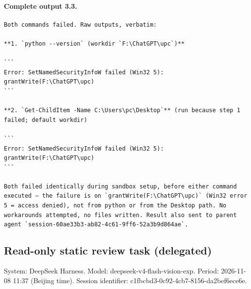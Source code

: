\documentclass[UTF8,10pt]{ctexart}
\begin{document}
\paragraph{Complete output 3.3.}
\begin{Verbatim}[breaklines=true,breakanywhere=true,fontsize=\scriptsize,frame=single,framesep=2pt]
Both commands failed. Raw outputs, verbatim:

**1. `python --version` (workdir `F:\ChatGPT\upc`)**

```
Error: SetNamedSecurityInfoW failed (Win32 5): grantWrite(F:\ChatGPT\upc)
```

**2. `Get-ChildItem -Name C:\Users\pc\Desktop`** (run because step 1 failed; default workdir)

```
Error: SetNamedSecurityInfoW failed (Win32 5): grantWrite(F:\ChatGPT\upc)
```

Both failed identically during sandbox setup, before either command executed — the failure is on `grantWrite(F:\ChatGPT\upc)` (Win32 error 5 = access denied), not from python or from the Desktop path. No workarounds attempted, no files written. Result also sent to parent agent `session-60ae33b3-ab82-4c61-9ff6-52a3b9d864ae`.
\end{Verbatim}

\subsection*{Read-only static review task (delegated)}
\noindent System: DeepSeek Harness. Model: deepseek-v4-flash-vision-exp. Period: 2026-11-08 11:37 (Beijing time). Session identifier: c1fbcbd3-0c92-4cb7-8156-da2bef6ece6e.
\end{document}
